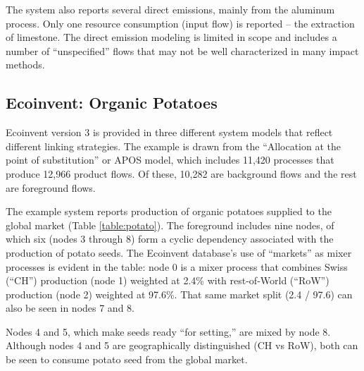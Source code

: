 The system also reports several direct emissions, mainly from the aluminum process.  Only one resource consumption (input flow) is reported -- the extraction of limestone. The direct emission modeling is limited in scope and includes a number of ``unspecified'' flows that may not be well characterized in many impact methods.


\subsection{Ecoinvent: Organic Potatoes}



Ecoinvent version 3 is provided in three different system models that reflect different linking strategies.  The example is drawn from the ``Allocation at the point of substitution'' or APOS model, which includes 11,420 processes that produce 12,966 product flows.  Of these, 10,282 are background flows and the rest are foreground flows.

The example system reports production of organic potatoes supplied to the global market (Table \ref{table:potato}).  The foreground includes nine nodes, of which six (nodes 3 through 8) form a cyclic dependency associated with the production of potato seeds.  The Ecoinvent database's use of ``markets'' as mixer processes is evident in the table: node 0 is a mixer process that combines Swiss (``CH'') production (node 1) weighted at 2.4\%  with rest-of-World (``RoW'') production (node 2) weighted at 97.6\%.  That same market split (2.4 / 97.6) can also be seen in nodes 7 and 8.

Nodes 4 and 5, which make seeds ready ``for setting,'' are mixed by node 8. Although nodes 4 and 5 are geographically distinguished (CH vs RoW), both can be seen to consume potato seed from the global market.

